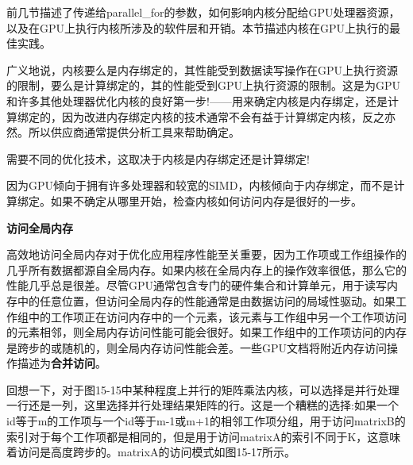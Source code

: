 前几节描述了传递给parallel\_for的参数，如何影响内核分配给GPU处理器资源，以及在GPU上执行内核所涉及的软件层和开销。本节描述内核在GPU上执行的最佳实践。\par

广义地说，内核要么是内存绑定的，其性能受到数据读写操作在GPU上执行资源的限制，要么是计算绑定的，其的性能受到GPU上执行资源的限制。这是为GPU和许多其他处理器优化内核的良好第一步!——用来确定内核是内存绑定，还是计算绑定的，因为改进内存绑定内核的技术通常不会有益于计算绑定内核，反之亦然。所以供应商通常提供分析工具来帮助确定。\par

\begin{tcolorbox}[colback=red!5!white,colframe=red!75!black]
需要不同的优化技术，这取决于内核是内存绑定还是计算绑定!
\end{tcolorbox}

因为GPU倾向于拥有许多处理器和较宽的SIMD，内核倾向于内存绑定，而不是计算绑定。如果不确定从哪里开始，检查内核如何访问内存是很好的一步。\par

\hspace*{\fill} \par %
\textbf{访问全局内存}

高效地访问全局内存对于优化应用程序性能至关重要，因为工作项或工作组操作的几乎所有数据都源自全局内存。如果内核在全局内存上的操作效率很低，那么它的性能几乎总是很差。尽管GPU通常包含专门的硬件集合和计算单元，用于读写内存中的任意位置，但访问全局内存的性能通常是由数据访问的局域性驱动。如果工作组中的工作项正在访问内存中的一个元素，该元素与工作组中另一个工作项访问的元素相邻，则全局内存访问性能可能会很好。如果工作组中的工作项访问的内存是跨步的或随机的，则全局内存访问性能会差。一些GPU文档将附近内存访问操作描述为\textbf{合并访问}。\par

回想一下，对于图15-15中某种程度上并行的矩阵乘法内核，可以选择是并行处理一行还是一列，这里选择并行处理结果矩阵的行。这是一个糟糕的选择:如果一个id等于m的工作项与一个id等于m-1或m+1的相邻工作项分组，用于访问matrixB的索引对于每个工作项都是相同的，但是用于访问matrixA的索引不同于K，这意味着访问是高度跨步的。matrixA的访问模式如图15-17所示。\par

